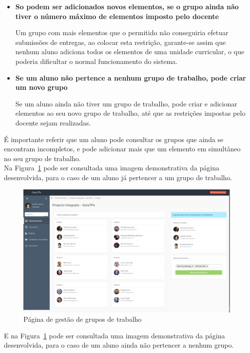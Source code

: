 \begin{itemize}
  \item \textbf{So podem ser adicionados novos elementos, se o grupo ainda não tiver o número máximo de elementos imposto pelo docente}

    Um grupo com mais elementos que o permitido não conseguiria efetuar submissões de entregas, ao colocar esta restrição, garante-se assim que nenhum aluno adiciona todos os elementos de uma unidade curricular, o que poderia dificultar o normal funcionamento do sistema.

  \item \textbf{Se um aluno não pertence a nenhum grupo de trabalho, pode criar um novo grupo}

    Se um aluno ainda não tiver um grupo de trabalho, pode criar e adicionar elementos ao seu novo grupo de trabalho, até que as restrições impostas pelo docente sejam realizadas.

\end{itemize}

É importante referir que um aluno pode consultar os grupos que ainda se encontram incompletos, e pode adicionar mais que um elemento em simultâneo no seu grupo de trabalho.\\

Na Figura~\ref{fig:student_groups_add} pode ser consultada uma imagem demonstrativa da página desenvolvida, para o caso de um aluno já pertencer a um grupo de trabalho.

\begin{figure}[H]
  \centering
  \includegraphics[width=1\textwidth,center]{images/implementacao/alunos/groups_add}
  \caption{Página de gestão de grupos de trabalho}
  \label{fig:student_groups_add}
\end{figure}

E na Figura~\ref{fig:student_groups_add} pode ser consultada uma imagem demonstrativa da página desenvolvida, para o caso de um aluno ainda não pertencer a nenhum grupo.



